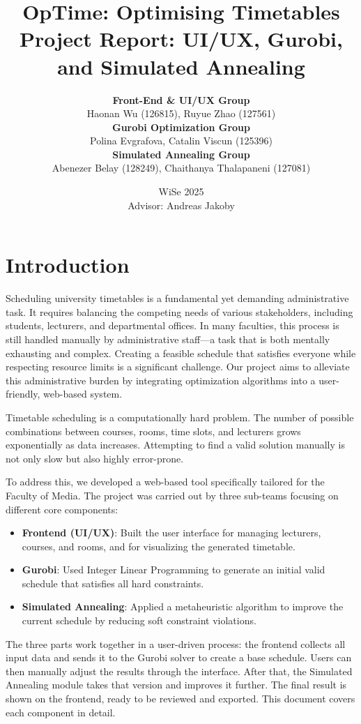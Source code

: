 \documentclass[11pt,a4paper]{article}
\title{\textbf{OpTime: Optimising Timetables} \\ \large Project Report: UI/UX, Gurobi, and Simulated Annealing}
\author{
    \textbf{Front-End \& UI/UX Group} \\
    Haonan Wu (126815), Ruyue Zhao (127561) \\[1ex]
    \textbf{Gurobi Optimization Group} \\
    Polina Evgrafova, Catalin Viscun (125396)\\[1ex]
    \textbf{Simulated Annealing Group} \\
    Abenezer Belay (128249), Chaithanya Thalapaneni  (127081)
}
\date{WiSe 2025 \\ Advisor: Andreas Jakoby}
\begin{document}
\maketitle
\newpage
\tableofcontents
\newpage

\section{Introduction}
Scheduling university timetables is a fundamental yet demanding administrative task. It requires balancing the competing needs of various stakeholders, including students, lecturers, and departmental offices. In many faculties, this process is still handled manually by administrative staff---a task that is both mentally exhausting and complex. Creating a feasible schedule that satisfies everyone while respecting resource limits is a significant challenge. Our project aims to alleviate this administrative burden by integrating optimization algorithms into a user-friendly, web-based system.

Timetable scheduling is a computationally hard problem. The number of possible combinations between courses, rooms, time slots, and lecturers grows exponentially as data increases. Attempting to find a valid solution manually is not only slow but also highly error-prone.

To address this, we developed a web-based tool specifically tailored for the Faculty of Media. The project was carried out by three sub-teams focusing on different core components:

\begin{itemize}
    \item \textbf{Frontend (UI/UX)}: Built the user interface for managing lecturers, courses, and rooms, and for visualizing the generated timetable.
    \item \textbf{Gurobi}: Used Integer Linear Programming to generate an initial valid schedule that satisfies all hard constraints.
     \item \textbf{Simulated Annealing}: Applied a metaheuristic algorithm to improve the current schedule by reducing soft constraint violations.
\end{itemize}

The three parts work together in a user-driven process: the frontend collects all input data and sends it to the Gurobi solver to create a base schedule. Users can then manually adjust the results through the interface. After that, the Simulated Annealing module takes that version and improves it further. The final result is shown on the frontend, ready to be reviewed and exported. This document covers each component in detail.
\end{document}
